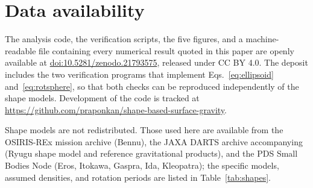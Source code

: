 %
%

\section*{Data availability}

The analysis code, the verification scripts, the five figures, and a
machine-readable file containing every numerical result quoted in this paper
are openly available at
\href{https://doi.org/10.5281/zenodo.21793575}{doi:10.5281/zenodo.21793575},
released under CC BY 4.0. The deposit includes the two verification programs
that implement Eqs.~\eqref{eq:ellipsoid} and~\eqref{eq:rotsphere}, so that both
checks can be reproduced independently of the shape models. Development of the
code is tracked at
\url{https://github.com/praponkan/shape-based-surface-gravity}.

Shape models are not redistributed. Those used here are available from the
OSIRIS-REx mission archive (Bennu), the JAXA DARTS archive accompanying
\citet{kanamaru2019} (Ryugu shape model and reference gravitational products),
and the PDS Small Bodies Node (Eros, Itokawa, Gaspra, Ida, Kleopatra); the
specific models, assumed densities, and rotation periods are listed in
Table~\ref{tab:shapes}.



%

